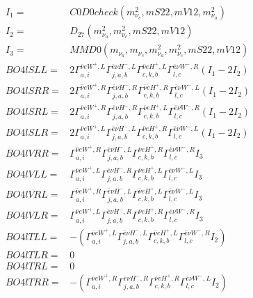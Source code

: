 \documentclass[A4,landscape]{article}
\begin{document}
\begin{align} 
I_1 = & C0D0check(m^2_{\nu_{{c}}}, mS22, mV12, m^2_{\nu_{{a}}}) \\ 
I_2 = & D_{27}(m^2_{\nu_{{a}}}, m^2_{\nu_{{c}}}, mS22, mV12) \\ 
I_3 = & MMD0(m_{\nu_{{a}}}, m_{\nu_{{c}}}, m^2_{\nu_{{a}}}, m^2_{\nu_{{c}}}, mS22, mV12) \\ 
  BO4lSLL= & 2  \Gamma^{\bar{\nu}e W^+,L}_{a, i} \Gamma^{\bar{e}\nu H^- ,L}_{j, a, b} \Gamma^{\bar{\nu}e H^+,L}_{c, k, b} \Gamma^{\bar{e}\nu W^- ,R}_{l, c} (I_1 - 2 I_2) \\ 
  BO4lSRR= & 2  \Gamma^{\bar{\nu}e W^+,R}_{a, i} \Gamma^{\bar{e}\nu H^- ,R}_{j, a, b} \Gamma^{\bar{\nu}e H^+,R}_{c, k, b} \Gamma^{\bar{e}\nu W^- ,L}_{l, c} (I_1 - 2 I_2) \\ 
  BO4lSRL= & 2  \Gamma^{\bar{\nu}e W^+,R}_{a, i} \Gamma^{\bar{e}\nu H^- ,R}_{j, a, b} \Gamma^{\bar{\nu}e H^+,L}_{c, k, b} \Gamma^{\bar{e}\nu W^- ,R}_{l, c} (I_1 - 2 I_2) \\ 
  BO4lSLR= & 2  \Gamma^{\bar{\nu}e W^+,L}_{a, i} \Gamma^{\bar{e}\nu H^- ,L}_{j, a, b} \Gamma^{\bar{\nu}e H^+,R}_{c, k, b} \Gamma^{\bar{e}\nu W^- ,L}_{l, c} (I_1 - 2 I_2) \\ 
  BO4lVRR= &  \Gamma^{\bar{\nu}e W^+,R}_{a, i} \Gamma^{\bar{e}\nu H^- ,L}_{j, a, b} \Gamma^{\bar{\nu}e H^+,R}_{c, k, b} \Gamma^{\bar{e}\nu W^- ,R}_{l, c} I_3 \\ 
  BO4lVLL= &  \Gamma^{\bar{\nu}e W^+,L}_{a, i} \Gamma^{\bar{e}\nu H^- ,R}_{j, a, b} \Gamma^{\bar{\nu}e H^+,L}_{c, k, b} \Gamma^{\bar{e}\nu W^- ,L}_{l, c} I_3 \\ 
  BO4lVRL= &  \Gamma^{\bar{\nu}e W^+,R}_{a, i} \Gamma^{\bar{e}\nu H^- ,L}_{j, a, b} \Gamma^{\bar{\nu}e H^+,L}_{c, k, b} \Gamma^{\bar{e}\nu W^- ,L}_{l, c} I_3 \\ 
  BO4lVLR= &  \Gamma^{\bar{\nu}e W^+,L}_{a, i} \Gamma^{\bar{e}\nu H^- ,R}_{j, a, b} \Gamma^{\bar{\nu}e H^+,R}_{c, k, b} \Gamma^{\bar{e}\nu W^- ,R}_{l, c} I_3 \\ 
  BO4lTLL= & -( \Gamma^{\bar{\nu}e W^+,L}_{a, i} \Gamma^{\bar{e}\nu H^- ,L}_{j, a, b} \Gamma^{\bar{\nu}e H^+,L}_{c, k, b} \Gamma^{\bar{e}\nu W^- ,R}_{l, c} I_2) \\ 
  BO4lTLR= & 0 \\ 
  BO4lTRL= & 0 \\ 
  BO4lTRR= & -( \Gamma^{\bar{\nu}e W^+,R}_{a, i} \Gamma^{\bar{e}\nu H^- ,R}_{j, a, b} \Gamma^{\bar{\nu}e H^+,R}_{c, k, b} \Gamma^{\bar{e}\nu W^- ,L}_{l, c} I_2) \\ 
\end{align} 
\end{document}
